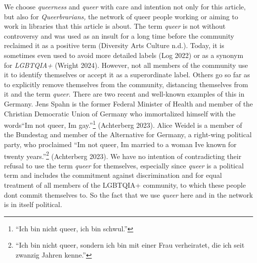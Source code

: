 \documentclass[a4paper,
fontsize=11pt,
oneside,
numbers=noperiodatend,
parskip=half-,
bibliography=totoc,
final
]{scrartcl}
\begin{document}
We choose \emph{queerness} and \emph{queer} with care and intention not
only for this article, but also for \emph{Queerbrarians,} the network of
queer people working or aiming to work in libraries that this article is
about. The term \emph{queer} is not without controversy and was used as
an insult for a long time before the community reclaimed it as a
positive term (Diversity Arts Culture n.d.). Today, it is sometimes even
used to avoid more detailed labels (Log 2022) or as a synonym for
\emph{LGBTQIA+} (Wright 2024). However, not all members of the community
use it to identify themselves or accept it as a superordinate label.
Others go so far as to explicitly remove themselves from the community,
distancing themselves from it and the term \emph{queer}. There are two
recent and well-known examples of this in Germany. Jens Spahn is the
former Federal Minister of Health and member of the Christian Democratic
Union of Germany who immortalized himself with the words\enquote{I\textquotesingle m not queer, I\textquotesingle m gay.}\footnote{\enquote{Ich
  bin nicht queer, ich bin schwul.}} (Achterberg 2023). Alice Weidel is
a member of the Bundestag and member of the Alternative for Germany, a
right-wing political party, who proclaimed \enquote{I\textquotesingle m not
queer, I\textquotesingle m married to a woman I\textquotesingle ve known
for twenty years.}\footnote{\enquote{Ich bin nicht queer, sondern ich
  bin mit einer Frau verheiratet, die ich seit zwanzig Jahren kenne.}}
(Achterberg 2023). We have no intention of contradicting their refusal
to use the term \emph{queer} for themselves, especially since
\emph{queer} is a political term and includes the commitment against
discrimination and for equal treatment of all members of the LGBTQIA+
community, to which these people don\textquotesingle t commit themselves
to. So the fact that we use \emph{queer} here and in the network is in
itself political.
\end{document}
